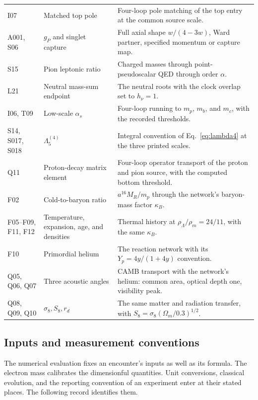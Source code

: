 \documentclass[aps,prx,onecolumn,10pt,notitlepage,nofootinbib,longbibliography]{revtex4-2}
\numberwithin{equation}{section}
\numberwithin{table}{section}
\newcommand{\MR}{M_R}
\newcommand{\hover}{h_\nu}
\begin{document}
\begin{longtable}{@{}>{\raggedright\arraybackslash}p{}>{\raggedright\arraybackslash}p{}>{\raggedright\arraybackslash}p{}@{}}
I07&Matched top pole&Four-loop pole matching of the top entry at the common source scale.\\[3pt]
A001, S06&$g_P$ and singlet capture&Full axial shape $w/(4-3w)$, Ward partner, specified momentum or capture map.\\[3pt]
S15&Pion leptonic ratio&Charged masses through point-pseudoscalar QED through order $\alpha$.\\[3pt]
L21&Neutral mass-sum endpoint&The neutral roots with the clock overlap set to $\hover=1$.\\[3pt]
I06, T09&Low-scale $\alpha_s$&Four-loop running to $m_p$, $m_b$, and $m_c$, with the recorded thresholds.\\[3pt]
S14, S017, S018&$\Lambda_5^{(4)}$&Integral convention of Eq.~\eqref{eq:lambda4} at the three printed scales.\\[3pt]
Q11&Proton-decay matrix element&Four-loop operator transport of the proton and pion source, with the computed bottom threshold.\\[3pt]
F02&Cold-to-baryon ratio&$a^{16}\MR/m_p$ through the network's baryon-mass factor $\kappa_B$.\\[3pt]
F05--F09, F11, F12&Temperature, expansion, age, and densities&Thermal history at $\rho_\Lambda/\rho_m=24/11$, with the same $\kappa_B$.\\[3pt]
F10&Primordial helium&The reaction network with its $Y_p=4y/(1+4y)$ convention.\\[3pt]
Q05, Q06, Q07&Three acoustic angles&CAMB transport with the network's helium: common area, optical depth one, visibility peak.\\[3pt]
Q08, Q09, Q10&$\sigma_8,S_8,r_d$&The same matter and radiation transfer, with $S_8=\sigma_8(\Omega_m/0.3)^{1/2}$.\\
\end{longtable}
\endgroup

\subsection{Inputs and measurement conventions}
The numerical evaluation fixes an encounter's inputs as well as its formula. The electron mass calibrates the dimensionful quantities. Unit conversions, classical evolution, and the reporting convention of an experiment enter at their stated places. The following record identifies them.
\end{document}
